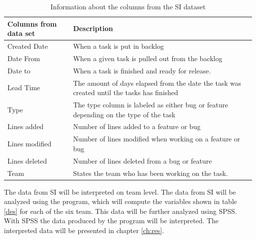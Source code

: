 \documentclass[UKenglish]{ifimaster}  %
\begin{document}
\begin{table}[!ht]
\begin{center}
    \begin{tabular}{| l | p{5cm} |}
    \hline
     Columns from data set & Description\\ \hline
     Created Date & When a task is put in backlog \\ \hline
     Date From & When a given task is pulled out from the backlog\\ \hline
     Date to & When a task is finished and ready for release. \\ \hline
    Lead Time & The amount of days elapsed from the date the task was created until the tasks has finished  \\ \hline
   Type & The type column is labeled as either bug or feature depending on the type of the task \\ \hline
   Lines added & Number of lines added to a feature or bug \\ \hline
   Lines modified & Number of lines modified when working on a feature or bug \\ \hline
   Lines deleted & Number of lines deleted from a bug or feature \\
    \hline
    Team &States the team who has been working on the task.\\ \hline
    \end{tabular}
\caption{Information about the columns from the SI dataset}
\label{IC} %
\end{center}
\end{table}

\newpage

The data from SI will be interpreted on team level. The data from SI will be analyzed using the program, which will compute the variables shown in table \ref{des} for each of the six team. This data will be further analyzed using SPSS. With SPSS the data produced by the program will be interpreted. The interpreted data will be presented in chapter \ref{ch:res}. 
\end{document}
